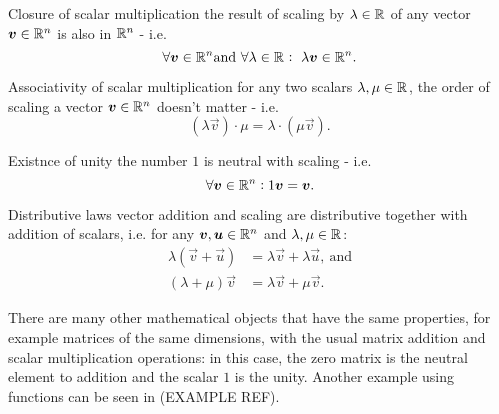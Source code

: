 \begin{descitemize}
    \item[Closure of scalar multiplication] the result of scaling by $\lambda\in\Rs$ of any vector $\vec{v}\in\Rs[n]$ is also in $\Rs[n]$ - i.e. 
    \begin{equation}
        \forall\vec{v}\in\Rs[n] \text{and}\ \forall\lambda\in\Rs:\ \lambda\vec{v}\in\Rs[n].
        \label{eq:scalar_multiplication_closure}
    \end{equation}

    \item[Associativity of scalar multiplication] for any two scalars $\lambda,\mu\in\Rs$, the order of scaling a vector $\vec{v}\in\Rs[n]$ doesn't matter - i.e.
    \begin{equation}
        \left(\lambda\vec{v}\right)\cdot\mu = \lambda\cdot\left(\mu\vec{v}\right).
        \label{eq:scalar_multiplication_associative}
    \end{equation}

    \item[Existnce of unity] the number $1$ is neutral with scaling - i.e.
        \begin{equation}
            \forall \vec{v}\in\Rs[n]: 1\vec{v}=\vec{v}.
            \label{eq:scalar_multiplication_unity}
        \end{equation}

    \item[Distributive laws] vector addition and scaling are distributive together with addition of scalars, i.e. for any $\vec{v},\vec{u}\in\Rs[n]$ and $\lambda,\mu\in\Rs$:
        \begin{align}
            \lambda\left(\vec{v}+\vec{u}\right) &= \lambda\vec{v} + \lambda\vec{u},\ \text{and}\\ \left(\lambda+\mu\right)\vec{v} &= \lambda\vec{v} + \mu\vec{v}.
            \label{eq:label}
        \end{align}
\end{descitemize}

There are many other mathematical objects that have the same properties, for example matrices of the same dimensions, with the usual matrix addition and scalar multiplication operations: in this case, the zero matrix is the neutral element to addition and the scalar $1$ is the unity. Another example using functions can be seen in (EXAMPLE REF).
